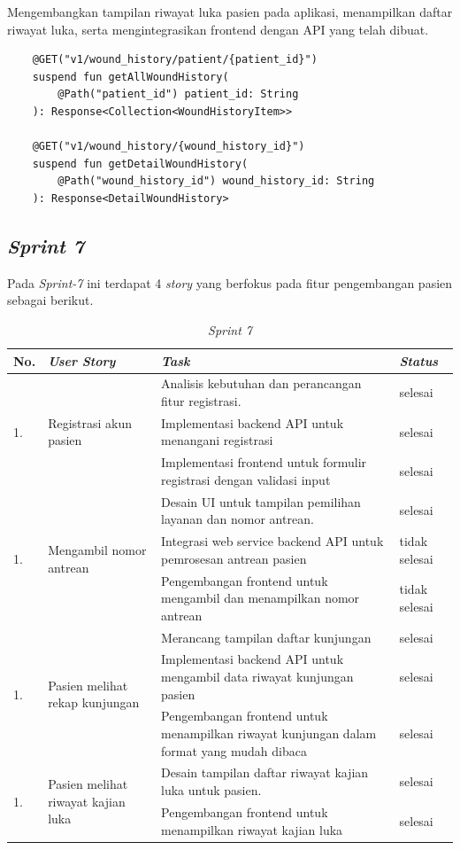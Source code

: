 \begin{enumerate}
Mengembangkan tampilan riwayat luka pasien pada aplikasi, menampilkan daftar riwayat luka, serta mengintegrasikan frontend dengan API yang telah dibuat.
\begin{lstlisting}
    @GET("v1/wound_history/patient/{patient_id}")
    suspend fun getAllWoundHistory(
        @Path("patient_id") patient_id: String
    ): Response<Collection<WoundHistoryItem>>

    @GET("v1/wound_history/{wound_history_id}")
    suspend fun getDetailWoundHistory(
        @Path("wound_history_id") wound_history_id: String
    ): Response<DetailWoundHistory>
\end{lstlisting}
\end{enumerate}

\subsection{\textit{Sprint 7}}
Pada \textit{Sprint-7} ini terdapat 4 \textit{story} yang berfokus pada fitur pengembangan pasien sebagai berikut.
	\begin{table}[H]
	\caption{\textit{Sprint 7}}
	\label{sprint7_backlog}
	\begin{tabular}{@{} |p{0.5cm}|p{5cm}|p{5cm}|p{2cm}| @{}}
		\hline
		\textbf{No.} & \textbf{\textit{User Story}} & \textbf{\textit{Task}} & \textbf{\textit{Status}} \\
		\hline
		\multirow{3}{3cm}{1.} & \multirow{3}{5cm}{Registrasi akun pasien} & Analisis kebutuhan dan perancangan fitur registrasi. & selesai\\
		\cline{3-4}
		 & & Implementasi backend API untuk menangani registrasi & selesai\\
		\cline{3-4}
		& & Implementasi frontend untuk formulir registrasi dengan validasi input & selesai\\
		\hline
		\multirow{3}{3cm}{1.} & \multirow{3}{5cm}{Mengambil nomor antrean} & Desain UI untuk tampilan pemilihan layanan dan nomor antrean. & selesai\\
		\cline{3-4}
		 & & Integrasi web service backend API untuk pemrosesan antrean pasien & tidak selesai\\
		\cline{3-4}
		 & & Pengembangan frontend untuk mengambil dan menampilkan nomor antrean & tidak selesai\\
		\hline
		\multirow{3}{3cm}{1.} & \multirow{3}{5cm}{Pasien melihat rekap kunjungan} & Merancang tampilan daftar kunjungan & selesai\\
		\cline{3-4}
		 & & Implementasi backend API untuk mengambil data riwayat kunjungan pasien & selesai\\
		\cline{3-4}
		 & & Pengembangan frontend untuk menampilkan riwayat kunjungan dalam format yang mudah dibaca & selesai\\
		\hline
		\multirow{3}{3cm}{1.} & \multirow{3}{5cm}{Pasien melihat riwayat kajian luka} & Desain tampilan daftar riwayat kajian luka untuk pasien. & selesai\\
		\cline{3-4}
		 & & Pengembangan frontend untuk menampilkan riwayat kajian luka & selesai\\
		\hline
	\end{tabular}
	\end{table}
